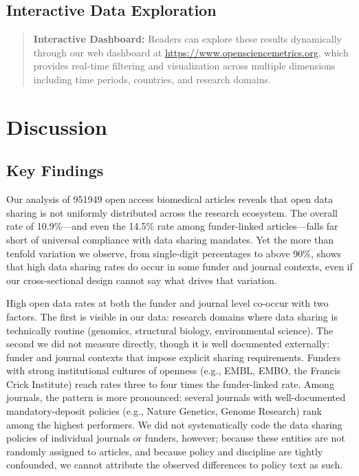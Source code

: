 \subsection{Interactive Data Exploration}

\begin{quote}
\textbf{Interactive Dashboard:} Readers can explore these results dynamically through our web dashboard at \url{https://www.opensciencemetrics.org}, which provides real-time filtering and visualization across multiple dimensions including time periods, countries, and research domains.
\end{quote}


\section{Discussion}

\subsection{Key Findings}

Our analysis of \num{951949} open access biomedical articles reveals that open data sharing is not uniformly distributed across the research ecosystem. The overall rate of 10.9\%---and even the 14.5\% rate among funder-linked articles---falls far short of universal compliance with data sharing mandates. Yet the more than tenfold variation we observe, from single-digit percentages to above 90\%, shows that high data sharing rates do occur in some funder and journal contexts, even if our cross-sectional design cannot say what drives that variation.

High open data rates at both the funder and journal level co-occur with two factors. The first is visible in our data: research domains where data sharing is technically routine (genomics, structural biology, environmental science). The second we did not measure directly, though it is well documented externally: funder and journal contexts that impose explicit sharing requirements. Funders with strong institutional cultures of openness (e.g., EMBL, EMBO, the Francis Crick Institute) reach rates three to four times the funder-linked rate. Among journals, the pattern is more pronounced: several journals with well-documented mandatory-deposit policies (e.g., Nature Genetics, Genome Research) rank among the highest performers. We did not systematically code the data sharing policies of individual journals or funders, however; because these entities are not randomly assigned to articles, and because policy and discipline are tightly confounded, we cannot attribute the observed differences to policy text as such.

